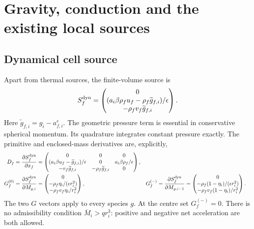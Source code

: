 \documentclass[11pt]{article}
\begin{document}
\section{Gravity, conduction and the existing local sources}
\subsection{Dynamical cell source}
Apart from thermal sources, the finite-volume source is
\begin{equation}
 S_f^{\rm dyn}=\begin{pmatrix}
 0\\(a_i\beta\rho_fu_f-\rho_f\widetilde g_{f,i})/\epsilon\\-\rho_fv_f\widetilde g_{f,i}
 \end{pmatrix}.
\end{equation}
Here $\widetilde g_{f,i}=g_i-a^e_{f,i}$. The geometric pressure term is essential in conservative spherical
momentum. Its quadrature integrates constant pressure exactly.
The primitive and enclosed-mass derivatives are, explicitly,
\begin{align}
 D_f=\frac{\partial S_f^{\rm dyn}}{\partial x_f}
 &=\begin{pmatrix}0&0&0\\
 (a_i\beta u_f-\widetilde g_{f,i})/\epsilon&0&a_i\beta\rho_f/\epsilon\\
 -v_f\widetilde g_{f,i}&-\rho_f\widetilde g_{f,i}&0\end{pmatrix},\\
 G_f^{(0)}=\frac{\partial S_f^{\rm dyn}}{\partial M_{g,i}}
 &=\begin{pmatrix}0\\-\rho_f\eta_i/(\epsilon r_i^2)\\-\rho_fv_f\eta_i/r_i^2\end{pmatrix},&
 G_f^{(-)}=\frac{\partial S_f^{\rm dyn}}{\partial M_{g,i-1}}
 &=\begin{pmatrix}0\\-\rho_f(1-\eta_i)/(\epsilon r_i^2)\\-\rho_fv_f(1-\eta_i)/r_i^2\end{pmatrix}.
 \label{eq:sourcejac}
\end{align}
The two $G$ vectors apply to every species $g$. At the centre set
$G_f^{(-)}=0$. There is no admissibility condition $\overline M_i>qr_i^3$:
positive and negative net acceleration are both allowed.
\end{document}
